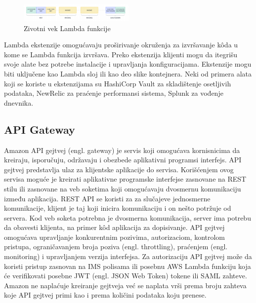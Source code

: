 \documentclass[12pt,oneside]{memoir}
\begin{document}

\begin{figure}[!ht]
  \centering
  \includegraphics[width=0.5\textwidth]{AWS-Lambda-zivotnivek.png}
  \caption{Zivotni vek Lambda funkcije}
  \label{fig:awsLambdaZivotniVek}
\end{figure}
 
Lambda ekstenzije omogućavaju proširivanje okruženja za izvršavanje kôda u kome se Lambda funkcija izvršava. Preko ekstenzija klijenti mogu da itegrišu svoje alate bez potrebe instalacije i upravljanja konfiguracijama. Ekstenzije mogu biti uključene kao Lambda sloj ili kao deo slike kontejnera. Neki od primera alata koji se koriste u ekstenzijama su HashiCorp Vault za skladištenje osetljivih podataka, NewRelic za praćenje performansi sistema, Splunk za vođenje dnevnika.

\subsection{API Gateway}
 
Amazon API gejtvej (engl. gateway) je servis koji omogućava kornisnicima da kreiraju, isporučuju, održavaju i obezbede aplikativni programsi interfejs. API gejtvej predstavlja ulaz za klijentske aplikacije do servisa. Korišćenjem ovog servisa moguće je kreirati aplikativne programske interfejse zasnovane na REST stilu ili zasnovane na veb soketima koji omogućavaju dvosmernu komunikaciju između aplikacija. REST API se koristi za za slučajeve jednosmerne komunikacije, klijent je taj koji inicira komunikaciju i on nešto potržuje od servera. Kod veb soketa potrebna je dvosmerna komunikacija, server ima potrebu da obavesti klijenta, na primer kôd aplikacija za dopisivanje. API gejtvej omogućava upravljanje konkurentnim pozivima, autorizaciom, kontrolom pristupa, ograničavanjem broja poziva (engl. throttling), praćenjem (engl. monitoring) i upravljanjem verzija interfejsa. Za autorizaciju API gejtvej može da koristi pristup zasnovan na IMS polisama ili posebnu AWS Lambda funkciju koja će verifikovati posebne JWT (engl. JSON Web Token) tokene ili SAML zahteve. Amazon ne naplaćuje kreiranje gejtveja već se naplata vrši prema broju zahteva koje API gejtvej primi kao i prema količini podataka koju prenese. 
 
\end{document}
